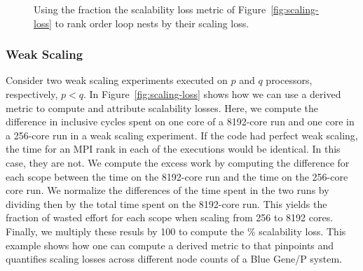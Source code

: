\documentclass[11pt,letterpaper]{report}
\begin{document}
\begin{figure}[t]
\caption{Using the fraction the scalability loss metric of Figure~\ref{fig:scaling-loss} to rank order loop nests by their scaling loss.}
\label{fig:scaling-loss-2}
\end{figure}


\subsubsection*{Weak Scaling}

Consider two weak scaling experiments executed on $p$ and $q$ processors, respectively, $p<q$.
In Figure~\ref{fig:scaling-loss} shows how we can use a derived metric to compute and attribute scalability losses.
Here, we compute the difference in inclusive cycles spent on one core of a 8192-core run and one core in a 256-core run in a weak scaling experiment.
If the code had perfect weak scaling, the time for an MPI rank in each of the executions would be identical. In this case, they are not. 
We compute the excess work by computing the difference for each scope between the time on the 8192-core  run and the time on the 256-core core run. 
We normalize the differences of the time spent in the two runs by dividing then by the total time spent on the 8192-core  run. This yields the fraction of wasted effort 
for each scope when scaling from 256 to 8192 cores. Finally, we multiply these resuls by 100 to compute the \% scalability loss.
This example shows how one can compute a derived metric to that pinpoints and quantifies scaling losses across different node counts of a Blue Gene/P system.
\end{document}

